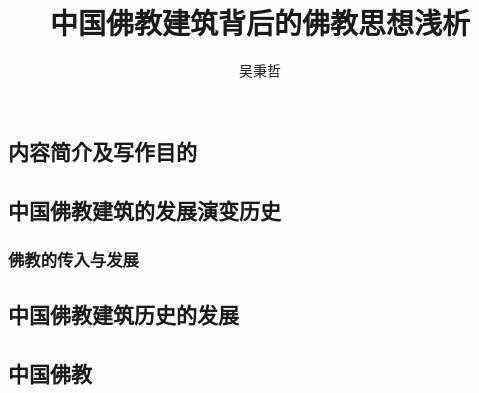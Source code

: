 \documentclass[10pt,a4paper]{ctexart}
\author{吴秉哲}
\title{中国佛教建筑背后的佛教思想浅析}
\begin{document}
	\maketitle
\subsection{内容简介及写作目的}
\subsection{中国佛教建筑的发展演变历史}
\subsubsection{佛教的传入与发展}
\subsection{中国佛教建筑历史的发展}
\subsection{中国佛教}
\end{document}
